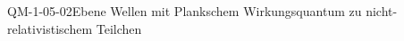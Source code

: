 
\begin{DEF}{QM-1-05-02}{Ebene Wellen mit Plankschem Wirkungsquantum zu nicht-relativistischem Teilchen}
\end{DEF}
